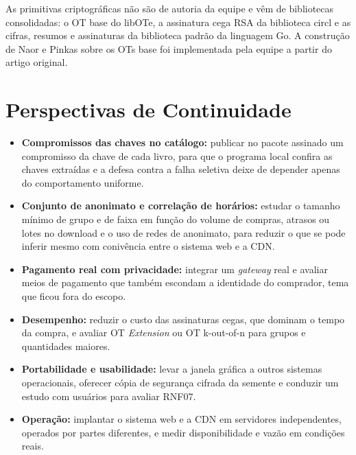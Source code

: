 As primitivas criptográficas não são de autoria da equipe e vêm de bibliotecas
consolidadas: o OT base do libOTe, a assinatura cega RSA da biblioteca circl e
as cifras, resumos e assinaturas da biblioteca padrão da linguagem Go. A
construção de Naor e Pinkas sobre os OTs base foi implementada pela equipe a
partir do artigo original.

\section{Perspectivas de Continuidade}

\begin{itemize}
\item \textbf{Compromissos das chaves no catálogo:} publicar no pacote
assinado um compromisso da chave de cada livro, para que o programa local
confira as chaves extraídas e a defesa contra a falha seletiva deixe de
depender apenas do comportamento uniforme.

\item \textbf{Conjunto de anonimato e correlação de horários:} estudar o
tamanho mínimo de grupo e de faixa em função do volume de compras, atrasos ou
lotes no download e o uso de redes de anonimato, para reduzir o que se pode
inferir mesmo com conivência entre o sistema web e a CDN.

\item \textbf{Pagamento real com privacidade:} integrar um \emph{gateway} real
e avaliar meios de pagamento que também escondam a identidade do comprador,
tema que ficou fora do escopo.

\item \textbf{Desempenho:} reduzir o custo das assinaturas cegas, que dominam o
tempo da compra, e avaliar OT \emph{Extension} ou OT k-out-of-n para grupos e
quantidades maiores.

\item \textbf{Portabilidade e usabilidade:} levar a janela gráfica a outros
sistemas operacionais, oferecer cópia de segurança cifrada da semente e
conduzir um estudo com usuários para avaliar RNF07.

\item \textbf{Operação:} implantar o sistema web e a CDN em servidores
independentes, operados por partes diferentes, e medir disponibilidade e vazão
em condições reais.
\end{itemize}
